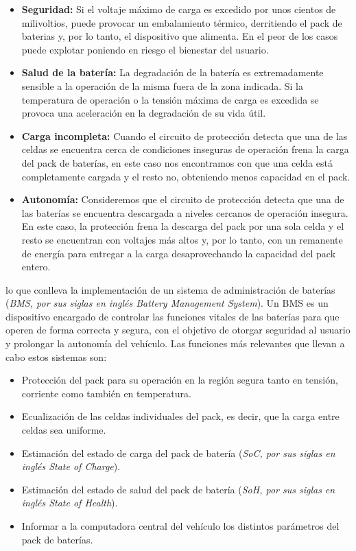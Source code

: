 \documentclass[10pt,a4paper]{article}
\begin{document}
	\begin{itemize}
		\item \textbf{Seguridad:} Si el voltaje máximo de carga es excedido por 
        unos cientos de milivoltios, puede provocar un embalamiento térmico, 
        derritiendo el pack de baterias y, por lo tanto, el dispositivo que 
        alimenta. En el peor de los casos puede explotar poniendo en riesgo el 
        bienestar del usuario.
		\item \textbf{Salud de la batería:} La degradación de la batería es 
        extremadamente sensible a la operación de la misma fuera de la zona 
        indicada. Si la temperatura de operación o la tensión máxima de carga 
        es excedida se provoca una aceleración en la degradación de su vida 
        útil.
		\item \textbf{Carga incompleta:} Cuando el circuito de protección 
        detecta que una de las celdas se encuentra cerca de condiciones 
        inseguras de operación frena la carga del pack de baterías, en este 
        caso nos encontramos con que una celda está completamente cargada y el 
        resto no, obteniendo menos capacidad en el pack.
		\item \textbf{Autonomía:} Consideremos que el circuito de protección 
        detecta que una de las baterías se encuentra descargada a niveles 
        cercanos de operación insegura. En este caso, la protección frena la 
        descarga del pack por una sola celda y el resto se encuentran con 
        voltajes más altos y, por lo tanto, con un remanente de energía para 
        entregar a la carga desaprovechando la capacidad del pack entero.
	\end{itemize}
    
    \noindent lo que conlleva la implementación de un sistema de administración 
    de baterías (\emph{BMS, por sus siglas en inglés Battery Management 
    System}). Un BMS es un dispositivo encargado de controlar las funciones 
    vitales de las baterías para que operen de forma correcta y segura, con el 
    objetivo de otorgar seguridad al usuario y prolongar la autonomía del 
    vehículo. Las funciones más relevantes que llevan a cabo estos sistemas son:
	
	\begin{itemize}
		\item Protección del pack para su operación en la región segura tanto 
            en tensión, corriente como también en temperatura.
		\item Ecualización de las celdas individuales del pack, es decir, que 
            la carga entre celdas sea uniforme.
		\item Estimación del estado de carga del pack de batería 
            (\emph{SoC, por sus siglas en inglés State of Charge}).
		\item Estimación del estado de salud del pack de batería 
            (\emph{SoH, por sus siglas en inglés State of Health}).
		\item Informar a la computadora central del vehículo los distintos 
            parámetros del pack de baterías.
	\end{itemize}
\end{document}

